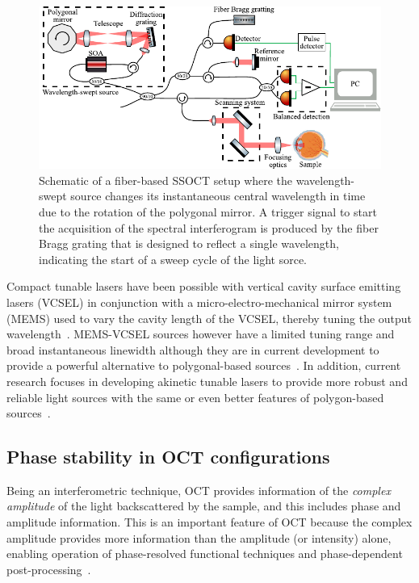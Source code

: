 \begin{figure}[htb!]
    \centering
    \includegraphics[width=\textwidth]{Figures/TheoreticalBasis/SSOCT_Scheme.pdf}
    \caption{Schematic of a fiber-based SSOCT setup where the wavelength-swept source changes its instantaneous central wavelength in time due to the rotation of the polygonal mirror. A trigger signal to start the acquisition of the spectral interferogram is produced by the fiber Bragg grating that is designed to reflect a single wavelength, indicating the start of a sweep cycle of the light sorce.}
    \label{fig:SSOCT_Scheme}
\end{figure}

Compact tunable lasers have been possible with vertical cavity surface emitting lasers (VCSEL) in conjunction with a micro-electro-mechanical mirror system (MEMS) used to vary the cavity length of the VCSEL, thereby tuning the output wavelength~\cite{Vail1995_Tunable}. MEMS-VCSEL sources however have a limited tuning range and broad instantaneous linewidth although they are in current development to provide a powerful alternative to polygonal-based sources~\cite{Jayaraman2011_OCT}. In addition, current research focuses in developing akinetic tunable lasers to provide more robust and reliable light sources with the same or even better features of polygon-based sources~\cite{Lee2018_Akinetic}.

\subsection{Phase stability in OCT configurations}\label{sec:OCTConfigPhaseStab}

Being an interferometric technique, OCT provides information of the \textit{complex amplitude} of the light backscattered by the sample, and this includes phase and amplitude information. This is an important feature of OCT because the complex amplitude provides more information than the amplitude (or intensity) alone, enabling operation of phase-resolved functional techniques and phase-dependent post-processing~\cite{Park2020_Angiographic, Vakoc2005_Phaseresolved, White2003_vivo}.

